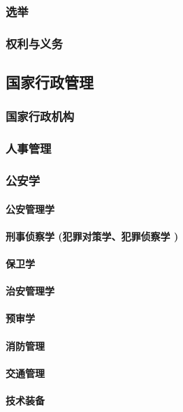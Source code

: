 \documentclass[UTF8]{../RepresentationUniverse}
\begin{document}
    \subsubsection{选举}
    \subsubsection{权利与义务}

\subsection{国家行政管理}
    \subsubsection{国家行政机构}
    \subsubsection{人事管理}
    \subsubsection{公安学}
        \paragraph{公安管理学}
        \paragraph{刑事侦察学 (犯罪对策学、犯罪侦察学 )}
        \paragraph{保卫学}
        \paragraph{治安管理学}
        \paragraph{预审学}
        \paragraph{消防管理}
        \paragraph{交通管理}
        \paragraph{技术装备}
\end{document}
